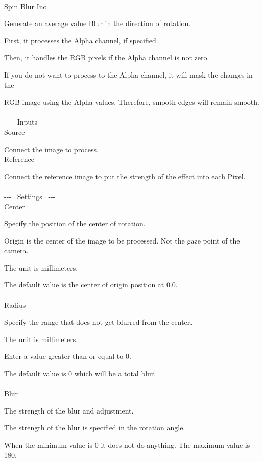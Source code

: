\documentclass[a4paper,12pt]{article}
\begin{document}
\thispagestyle{empty}

\Large
\noindent \\
Spin Blur Ino\medskip
\par
\normalsize
Generate an average value Blur in the direction of rotation.\\
\par
First, it processes the Alpha channel, if specified.\par
Then, it handles the RGB pixels if the Alpha channel is not zero.\par
If you do not want to process to the Alpha channel, it will mask the changes in the\par
RGB image using the Alpha values. Therefore, smooth edges will remain smooth.\\
\\
-{-}- \ Inputs \ -{-}-\\
Source\par
Connect the image to process.\\
Reference\par
Connect the reference image to put the strength of the effect into each Pixel.\\
\\
-{-}- \ Settings \ -{-}-\\
Center\par
Specify the position of the center of rotation.\par
Origin is the center of the image to be processed. Not the gaze point of the camera.\par
The unit is millimeters.\par
The default value is the center of origin position at  0.0\textquotedbl .\\
\\
Radius\par
Specify the range that does not get blurred from the center.\par
The unit is millimeters.\par
Enter a value greater than or equal to 0.\par
The default value is 0 which will be a total blur.\\
\\
Blur\par
The strength of the blur and adjustment.\par
The strength of the blur is specified in the rotation angle.\par
When the minimum value is 0 it does not do anything. The maximum value is 180.\par
\end{document}
